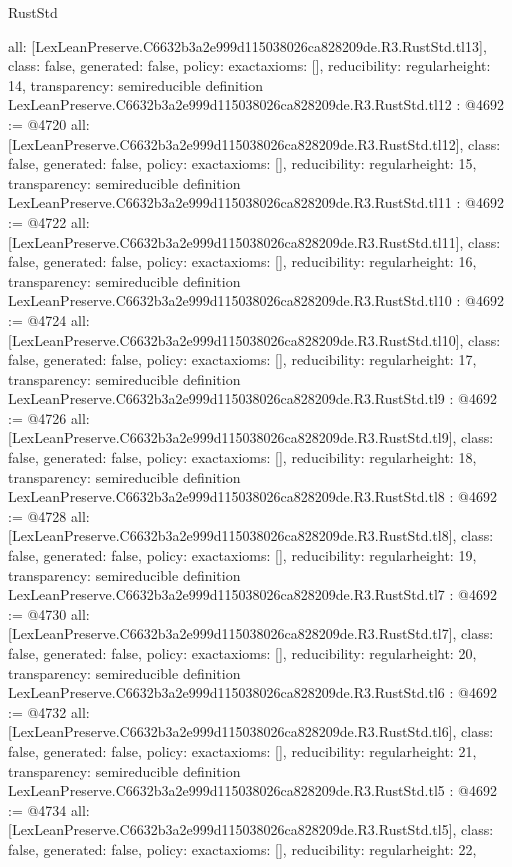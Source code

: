 \begin{lexlean}{RustStd}
\begin{coremodule}
{  all: [LexLeanPreserve.C6632b3a2e999d115038026ca828209de.R3.RustStd.tl13],
  class: false,
  generated: false,
  policy: exact{axioms: []},
  reducibility: regular{height: 14},
  transparency: semireducible
}
definition LexLeanPreserve.C6632b3a2e999d115038026ca828209de.R3.RustStd.tl12 : @4692 := @4720 {
  all: [LexLeanPreserve.C6632b3a2e999d115038026ca828209de.R3.RustStd.tl12],
  class: false,
  generated: false,
  policy: exact{axioms: []},
  reducibility: regular{height: 15},
  transparency: semireducible
}
definition LexLeanPreserve.C6632b3a2e999d115038026ca828209de.R3.RustStd.tl11 : @4692 := @4722 {
  all: [LexLeanPreserve.C6632b3a2e999d115038026ca828209de.R3.RustStd.tl11],
  class: false,
  generated: false,
  policy: exact{axioms: []},
  reducibility: regular{height: 16},
  transparency: semireducible
}
definition LexLeanPreserve.C6632b3a2e999d115038026ca828209de.R3.RustStd.tl10 : @4692 := @4724 {
  all: [LexLeanPreserve.C6632b3a2e999d115038026ca828209de.R3.RustStd.tl10],
  class: false,
  generated: false,
  policy: exact{axioms: []},
  reducibility: regular{height: 17},
  transparency: semireducible
}
definition LexLeanPreserve.C6632b3a2e999d115038026ca828209de.R3.RustStd.tl9 : @4692 := @4726 {
  all: [LexLeanPreserve.C6632b3a2e999d115038026ca828209de.R3.RustStd.tl9],
  class: false,
  generated: false,
  policy: exact{axioms: []},
  reducibility: regular{height: 18},
  transparency: semireducible
}
definition LexLeanPreserve.C6632b3a2e999d115038026ca828209de.R3.RustStd.tl8 : @4692 := @4728 {
  all: [LexLeanPreserve.C6632b3a2e999d115038026ca828209de.R3.RustStd.tl8],
  class: false,
  generated: false,
  policy: exact{axioms: []},
  reducibility: regular{height: 19},
  transparency: semireducible
}
definition LexLeanPreserve.C6632b3a2e999d115038026ca828209de.R3.RustStd.tl7 : @4692 := @4730 {
  all: [LexLeanPreserve.C6632b3a2e999d115038026ca828209de.R3.RustStd.tl7],
  class: false,
  generated: false,
  policy: exact{axioms: []},
  reducibility: regular{height: 20},
  transparency: semireducible
}
definition LexLeanPreserve.C6632b3a2e999d115038026ca828209de.R3.RustStd.tl6 : @4692 := @4732 {
  all: [LexLeanPreserve.C6632b3a2e999d115038026ca828209de.R3.RustStd.tl6],
  class: false,
  generated: false,
  policy: exact{axioms: []},
  reducibility: regular{height: 21},
  transparency: semireducible
}
definition LexLeanPreserve.C6632b3a2e999d115038026ca828209de.R3.RustStd.tl5 : @4692 := @4734 {
  all: [LexLeanPreserve.C6632b3a2e999d115038026ca828209de.R3.RustStd.tl5],
  class: false,
  generated: false,
  policy: exact{axioms: []},
  reducibility: regular{height: 22},
}
\end{coremodule}
\end{lexlean}
